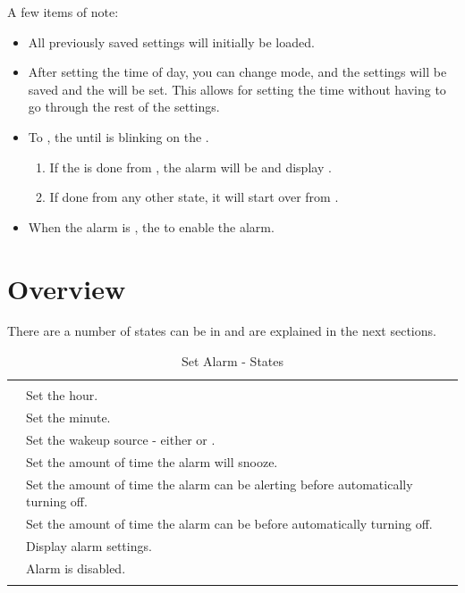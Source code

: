 \pagebreak

A few items of note:

\begin{itemize}
  \item All previously saved settings will initially be loaded.
  \item After setting the time of day, you can change mode, and the settings
    will be saved and the  will be set.  This allows for setting the time
    without having to go through the rest of the settings.
  \item To ,  the  until \symD{<<<<} is blinking on
    the .
    \begin{enumerate}
      \item If the  is done from , the alarm will be
         and display .
      \item If done from any other state, it will start over from .
    \end{enumerate}
  \item When the alarm is ,  the  to enable the alarm.
\end{itemize}

\section{Overview}

There are a number of states  can be in and are explained in the next
sections.

\begin{table}[H]
\centering
\begin{tabu}{ X[1,c,m] | X[3,l,m] }
  \thrule

   &  \\ \mrule

   & Set the hour. \\ 
   & Set the minute. \\ 
   & Set the wakeup source - either  or . \\ 
   & Set the amount of time the alarm will snooze. \\ 
   & Set the amount of time the alarm can be alerting before
    automatically turning off. \\ 
   & Set the amount of time the alarm can be  
                before automatically turning off. \\ 
   & Display alarm settings. \\ 
   & Alarm is disabled. \\
  \bhrule
\end{tabu}
\caption{Set Alarm - States}
\end{table}

